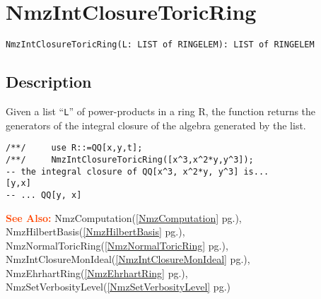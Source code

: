\documentclass[a4paper]{mybook}
\newenvironment{command}{}{} %
\newcommand\SeeAlso{\par\textcolor{OrangeRed}{\textbf{\large See Also: }}}
\begin{document}
\section{NmzIntClosureToricRing}
\label{NmzIntClosureToricRing}
\begin{command} %


\begin{Verbatim}[label=syntax, rulecolor=\color{MidnightBlue},
frame=single]
NmzIntClosureToricRing(L: LIST of RINGELEM): LIST of RINGELEM
\end{Verbatim}


\subsection*{Description}

Given a list ``\verb&L&'' of power-products in a ring R, the function returns the
generators of the integral closure of the algebra generated by the list.
\begin{Verbatim}[label=example, rulecolor=\color{PineGreen}, frame=single]
/**/     use R::=QQ[x,y,t];
/**/     NmzIntClosureToricRing([x^3,x^2*y,y^3]);
-- the integral closure of QQ[x^3, x^2*y, y^3] is...
[y,x]
-- ... QQ[y, x]
\end{Verbatim}


\SeeAlso %
  NmzComputation(\ref{NmzComputation} pg.\pageref{NmzComputation}), 
    NmzHilbertBasis(\ref{NmzHilbertBasis} pg.\pageref{NmzHilbertBasis}), 
    NmzNormalToricRing(\ref{NmzNormalToricRing} pg.\pageref{NmzNormalToricRing}), 
    NmzIntClosureMonIdeal(\ref{NmzIntClosureMonIdeal} pg.\pageref{NmzIntClosureMonIdeal}), 
    NmzEhrhartRing(\ref{NmzEhrhartRing} pg.\pageref{NmzEhrhartRing}), 
    NmzSetVerbosityLevel(\ref{NmzSetVerbosityLevel} pg.\pageref{NmzSetVerbosityLevel})
\end{command} %
\end{document}
